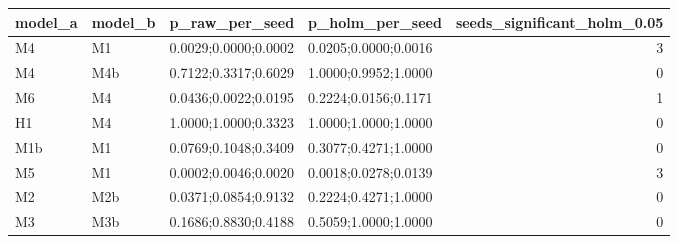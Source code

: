 \begin{tabular}{llllr}
\toprule
model\_a & model\_b & p\_raw\_per\_seed & p\_holm\_per\_seed & seeds\_significant\_holm\_0.05 \\
\midrule
M4 & M1 & 0.0029;0.0000;0.0002 & 0.0205;0.0000;0.0016 & 3 \\
M4 & M4b & 0.7122;0.3317;0.6029 & 1.0000;0.9952;1.0000 & 0 \\
M6 & M4 & 0.0436;0.0022;0.0195 & 0.2224;0.0156;0.1171 & 1 \\
H1 & M4 & 1.0000;1.0000;0.3323 & 1.0000;1.0000;1.0000 & 0 \\
M1b & M1 & 0.0769;0.1048;0.3409 & 0.3077;0.4271;1.0000 & 0 \\
M5 & M1 & 0.0002;0.0046;0.0020 & 0.0018;0.0278;0.0139 & 3 \\
M2 & M2b & 0.0371;0.0854;0.9132 & 0.2224;0.4271;1.0000 & 0 \\
M3 & M3b & 0.1686;0.8830;0.4188 & 0.5059;1.0000;1.0000 & 0 \\
\bottomrule
\end{tabular}
